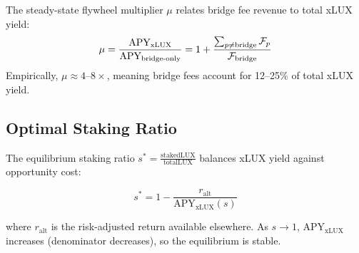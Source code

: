 \begin{definition}
\label{def:flywheel}
The steady-state flywheel multiplier $\mu$ relates bridge fee revenue to total xLUX yield:
\begin{equation}
  \mu = \frac{\text{APY}_{\text{xLUX}}}{\text{APY}_{\text{bridge-only}}} = 1 + \frac{\sum_{p \neq \text{bridge}} \mathcal{F}_p}{\mathcal{F}_{\text{bridge}}}
\end{equation}
Empirically, $\mu \approx 4$--$8\times$, meaning bridge fees account for 12--25\% of total xLUX yield.
\end{definition}

\subsection{Optimal Staking Ratio}

The equilibrium staking ratio $s^* = \frac{\text{stakedLUX}}{\text{totalLUX}}$ balances xLUX yield against opportunity cost:

\begin{equation}
  s^* = 1 - \frac{r_{\text{alt}}}{\text{APY}_{\text{xLUX}}(s)}
\end{equation}

where $r_{\text{alt}}$ is the risk-adjusted return available elsewhere. As $s \to 1$, $\text{APY}_{\text{xLUX}}$ increases (denominator decreases), so the equilibrium is stable.

